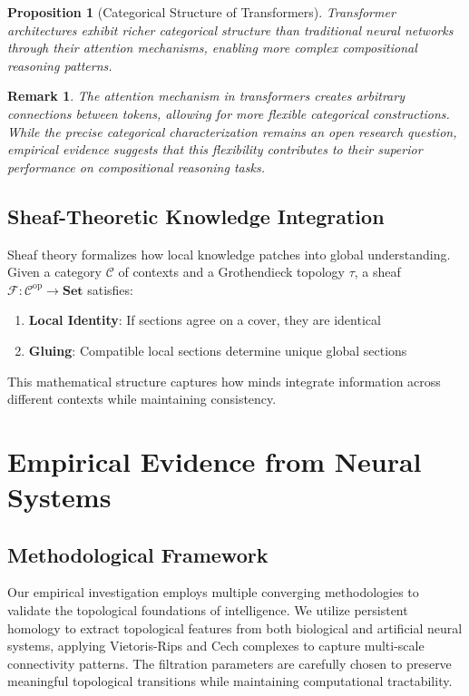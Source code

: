 \documentclass[11pt]{article}
\newtheorem{proposition}[theorem]{Proposition}
\newtheorem{remark}[theorem]{Remark}
\begin{document}
\begin{proposition}[Categorical Structure of Transformers]
Transformer architectures exhibit richer categorical structure than traditional neural networks through their attention mechanisms, enabling more complex compositional reasoning patterns.
\end{proposition}

\begin{remark}
The attention mechanism in transformers creates arbitrary connections between tokens, allowing for more flexible categorical constructions. While the precise categorical characterization remains an open research question, empirical evidence suggests that this flexibility contributes to their superior performance on compositional reasoning tasks.
\end{remark}

\subsection{Sheaf-Theoretic Knowledge Integration}

Sheaf theory formalizes how local knowledge patches into global understanding. Given a category $\mathcal{C}$ of contexts and a Grothendieck topology $\tau$, a sheaf $\mathcal{F}: \mathcal{C}^{\text{op}} \to \mathbf{Set}$ satisfies:

\begin{enumerate}
\item \textbf{Local Identity}: If sections agree on a cover, they are identical
\item \textbf{Gluing}: Compatible local sections determine unique global sections
\end{enumerate}

This mathematical structure captures how minds integrate information across different contexts while maintaining consistency.

\section{Empirical Evidence from Neural Systems}

\subsection{Methodological Framework}

Our empirical investigation employs multiple converging methodologies to validate the topological foundations of intelligence. We utilize persistent homology to extract topological features from both biological and artificial neural systems, applying Vietoris-Rips and Cech complexes to capture multi-scale connectivity patterns. The filtration parameters are carefully chosen to preserve meaningful topological transitions while maintaining computational tractability.
\end{document}
